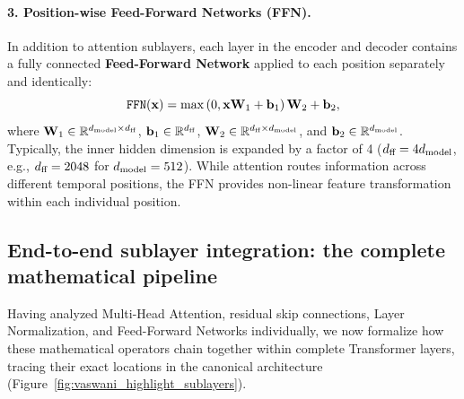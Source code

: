 \documentclass[../../main.tex]{subfiles}
\begin{document}
\paragraph{3. Position-wise Feed-Forward Networks (FFN).}
In addition to attention sublayers, each layer in the encoder and decoder contains a fully connected \textbf{Feed-Forward Network} applied to each position separately and identically:
\begin{equation}
\label{eq:position_wise_ffn}
\text{\texttt{FFN}}(\mathbf{x}) = \max\left(0, \mathbf{x} \mathbf{W}_1 + \mathbf{b}_1\right) \mathbf{W}_2 + \mathbf{b}_2,
\end{equation}
where $\mathbf{W}_1 \in \mathbb{R}^{d_{\text{model}} \times d_{\text{ff}}}$, $\mathbf{b}_1 \in \mathbb{R}^{d_{\text{ff}}}$, $\mathbf{W}_2 \in \mathbb{R}^{d_{\text{ff}} \times d_{\text{model}}}$, and $\mathbf{b}_2 \in \mathbb{R}^{d_{\text{model}}}$. Typically, the inner hidden dimension is expanded by a factor of 4 ($d_{\text{ff}} = 4d_{\text{model}}$, e.g., $d_{\text{ff}} = 2048$ for $d_{\text{model}} = 512$). While attention routes information across different temporal positions, the FFN provides non-linear feature transformation within each individual position.

\subsection{End-to-end sublayer integration: the complete mathematical pipeline}
\label{subsec:end_to_end_sublayer_pipeline}

Having analyzed Multi-Head Attention, residual skip connections, Layer Normalization, and Feed-Forward Networks individually, we now formalize how these mathematical operators chain together within complete Transformer layers, tracing their exact locations in the canonical architecture (Figure~\ref{fig:vaswani_highlight_sublayers}).
\end{document}
